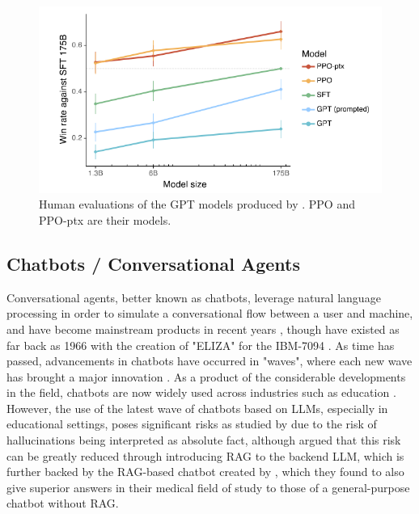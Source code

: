 \documentclass[12pt]{report}
\begin{document}
    \begin{figure}[H] 
        \centering
        \includegraphics[width=.8\linewidth]{ouyangLLMPreference.png}
        \caption{Human evaluations of the GPT models produced by \textcite{ouyang_training_2022}. PPO and PPO-ptx are their models.}
        \label{fig:LLMPref}
    \end{figure}


    \subsection{Chatbots / Conversational Agents}
    Conversational agents, better known as chatbots, leverage natural language processing in order to simulate a conversational flow 
    between a user and machine, and have become mainstream products in recent years \autocite{liao_all_2018},
    though have existed as far back as 1966 with the creation of "ELIZA" for the IBM-7094 \autocite{weizenbaum_elizacomputer_1966}.
    As time has passed, advancements in chatbots have occurred in "waves", where each new wave has brought a major innovation \autocite{schobel_charting_2024}.
    As a product of the considerable developments in the field, chatbots are now widely used 
    across industries such as education \autocite{kuhail_interacting_2023}. However, the use of the latest wave of chatbots based on LLMs,
    especially in educational settings, poses significant risks as studied by \textcite{neumann_llm-driven_2024}
    due to the risk of hallucinations being interpreted as absolute fact, although \textcite{shuster_retrieval_2021} 
    argued that this risk can be greatly reduced through introducing RAG to the backend LLM, which is further backed 
    by the RAG-based chatbot created by \textcite{ge_development_2023}, which they found to also give superior answers
    in their medical field of study to those of a general-purpose chatbot without RAG.  
\end{document}
